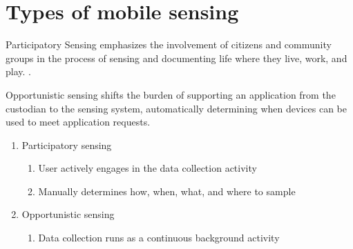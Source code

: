\section{Types of mobile sensing}  


\begin{defi}
Participatory  Sensing  emphasizes  the  involvement  of  citizens  and  community  groups  in  the 
process  of  sensing  and  documenting  life  where  they  live,  work,  and  play. \cite{Goldman2009}. 
\end{defi}

\begin{defi}
Opportunistic sensing shifts the burden of supporting an application from the custodian to the sensing system, automatically determining when devices can be used to meet application requests. \cite{Lane:2008:USS:1411759.1411763} 
\end{defi}



\begin{enumerate}
    \item  Participatory sensing
    
    \begin{enumerate}
        \item  User actively engages in the data collection activity

        \item  Manually determines how, when, what, and where to sample
   
    \end{enumerate}
            
    \item  Opportunistic sensing
    
        \begin{enumerate}
        \item   Data collection runs as a continuous background activity

    \end{enumerate}
\end{enumerate}

